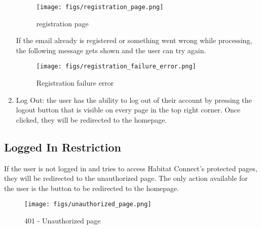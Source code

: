 \documentclass[conference]{IEEEtran}
\begin{document}
\begin{enumerate}
    \begin{figure}[H]
    \centering
    \texttt{[image: figs/registration\_page.png]}
    \caption{registration page}
    \label{fig:Registration page}
    \end{figure}
    If the email already is registered or something went wrong while processing, the following message gets shown and the user can try again.
    \begin{figure}[H]
    \centering
    \texttt{[image: figs/registration\_failure\_error.png]}
    \caption{Registration failure error}
    \label{fig:Registration failure error}
    \end{figure}
    \item Log Out: the user has the ability to log out of their account by pressing the logout button that is visible on every page in the top right corner. Once clicked, they will be redirected to the homepage.
\end{enumerate}
\subsection{Logged In Restriction}
If the user is not logged in and tries to access Habitat Connect’s protected pages, they will be redirected to the unauthorized page. The only action available for the user is the button to be redirected to the homepage.
\begin{figure}[H]
\centering
\texttt{[image: figs/unauthorized\_page.png]}
\caption{401 - Unauthorized page}
\label{fig:401 - Unauthorized page}
\end{figure}
\end{document}
